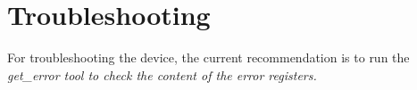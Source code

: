 \chapter{Troubleshooting}
\label{chap:troubleshooting}

For troubleshooting the device, the current recommendation is to run the \em get\_error tool to check the content of the error registers.





